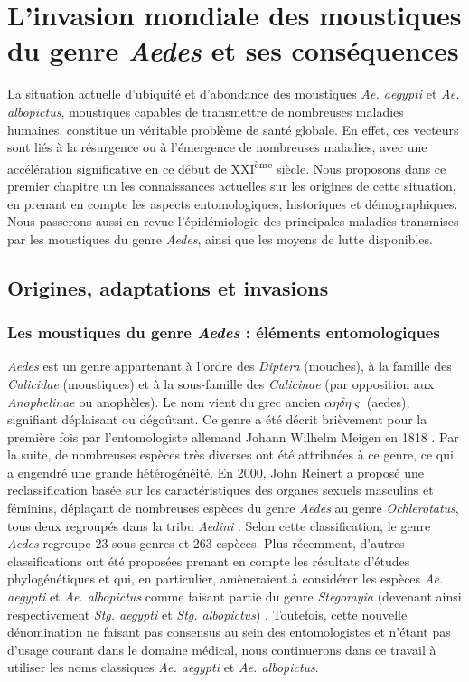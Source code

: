 \chapter{L'invasion mondiale des moustiques du genre {\em Aedes} et ses conséquences}
\chaptermark{}

La situation actuelle d'ubiquité et d'abondance des moustiques {\em Ae. aegypti} et {\em Ae. albopictus}, moustiques capables de transmettre de nombreuses maladies humaines, constitue un véritable problème de santé globale. 
En effet, ces vecteurs sont liés à la résurgence ou à l'émergence de nombreuses maladies, avec une accélération significative en ce début de XXI\textsuperscript{ème} siècle.
Nous proposons dans ce premier chapitre un les connaissances actuelles sur les origines de cette situation, en prenant en compte les aspects entomologiques, historiques et démographiques.
Nous passerons aussi en revue l'épidémiologie des principales maladies transmises par les moustiques du genre {\em Aedes}, ainsi que les moyens de lutte disponibles.

\section[Origines, adaptations \& invasions]{Origines, adaptations et invasions}

\subsection{Les moustiques du genre {\em Aedes} : éléments entomologiques}

{\em Aedes} est un genre appartenant à l'ordre des {\em Diptera} (mouches), à la famille des {\em Culicidae} (moustiques) et à la sous-famille des {\em Culicinae} (par opposition aux {\em Anophelinae} ou anophèles).
Le nom vient du grec ancien  $\alpha \eta \delta \eta \varsigma$ (aedes), signifiant \guillemotleft déplaisant\guillemotright \; ou \guillemotleft dégoûtant\guillemotright.
Ce genre a été décrit brièvement pour la première fois par l'entomologiste allemand Johann Wilhelm Meigen en 1818 \cite{meigen1818}.
Par la suite, de nombreuses espèces très diverses ont été attribuées à ce genre, ce qui a engendré une grande hétérogénéité.
En 2000, John Reinert a proposé une reclassification basée sur les caractéristiques des organes sexuels masculins et féminins, déplaçant de nombreuses espèces du genre {\em Aedes} au genre {\em Ochlerotatus}, tous deux regroupés dans la tribu {\em Aedini} \cite{reinert2000new}.
Selon cette classification, le genre {\em Aedes} regroupe 23 sous-genres et 263 espèces. 
Plus récemment, d'autres classifications ont été proposées prenant en compte les résultats d'études phylogénétiques et qui, en particulier, amèneraient à considérer les espèces {\em Ae. aegypti} et {\em Ae. albopictus} comme faisant partie du genre {\em Stegomyia} (devenant ainsi respectivement {\em Stg. aegypti} et {\em Stg. albopictus}) \cite{reinert2004phylogeny}.
Toutefois, cette nouvelle dénomination ne faisant pas consensus au sein des entomologistes \cite{polaszek2006two} et n'étant pas d'usage courant dans le domaine médical, nous continuerons dans ce travail à utiliser les noms classiques {\em Ae. aegypti} et {\em Ae. albopictus}.


